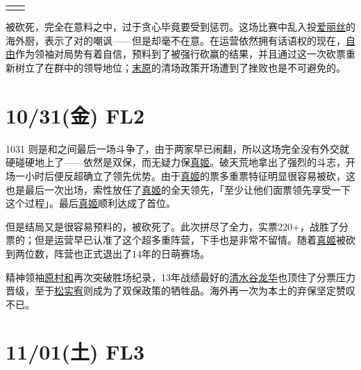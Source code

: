 \begin{tabular}{lr}
{\begin{minipage}{.45\textwidth}
\end{minipage}}
\end{tabular}
\CTEXindent
\clearpage
{}被砍死，完全在意料之中，过于贪心毕竟要受到惩罚。这场比赛中乱入投\uline{爱丽丝}的海外厨，表示了对的嘲讽——但是却毫不在意。在运营依然拥有话语权的现在，\uline{自由}作为领袖对局势有着自信，预料到了被强行砍赢的结果，并且通过这一次砍票重新树立了在群中的领导地位；\uline{末原}的清场政策开场遭到了挫败也是不可避免的。

\section{10/31(金) FL2}


1031 则是和之间最后一场斗争了，由于两家早已闹翻，所以这场完全没有外交就硬碰硬地上了——依然是双保，而无疑力保\uline{真姬}。破天荒地拿出了强烈的斗志，开场一小时后便反超确立了领先优势。由于\uline{真姬}的票多重票特征明显很容易被砍，这也是最后一次出场，索性放任了\uline{真姬}的全天领先，「至少让他们面票领先享受一下这个过程」。最后\uline{真姬}顺利达成了首位。

但是结局又是很容易预料的，被砍死了。此次拼尽了全力，实票220+，战胜了分票的；但是运营早已认准了这个超多重阵营，下手也是非常不留情。随着\uline{真姬}被砍到两位数，阵营也正式退出了14年的日萌赛场。

精神领袖\uline{原村和}再次突破胜场纪录，13年战绩最好的\uline{清水谷龙华}也顶住了分票压力晋级，至于\uline{松实宥}则成为了双保政策的牺牲品。海外再一次为本土的弃保坚定赞叹不已。

\section{11/01(土) FL3}

